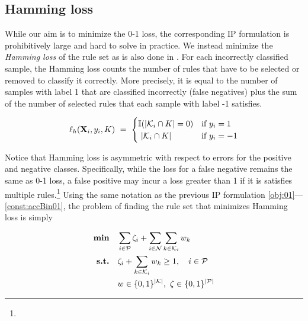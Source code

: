 \documentclass[twoside,11pt]{article}
\begin{document}
 \subsection{Hamming loss} \label{sec:ham}

While our aim is to minimize the 0-1 loss, the corresponding IP formulation is prohibitively large and hard to solve in practice. We instead minimize the {\em Hamming loss} of the rule set as is also done in \cite{su2016,lakkaraju2016}.  For each incorrectly classified sample, the Hamming loss counts %
    the number of rules that have to be selected or removed to classify it correctly.
	More precisely, it %
    is equal to the number of samples with label 1 that are classified incorrectly (false negatives) plus  the sum of the number of selected rules that each sample with label -1 satisfies.
    
\begin{definition}
$$\ell_{h}(\textbf{X}_i, y_i, K) ~=~
\begin{cases}
\mathbb{I}(\lvert{\cal K}_i \cap K \rvert= 0) & \text{if } y_i = 1\\
~\lvert\mathcal{K}_i \cap K\rvert &\text{if } y_i = -1
\end{cases}$$

\end{definition}
Notice that Hamming loss is asymmetric with respect to errors for the positive and negative classes. Specifically, while the loss for a false negative remains the same as 0-1 loss, a false positive may incur a loss greater than 1 if it is satisfies multiple rules.\footnote{}
Using the same notation as the previous IP formulation \eqref{obj:01}---\eqref{const:accBin01}, the problem of finding the rule set that minimizes Hamming loss is simply

\begin{align}
\textbf{min} \quad & \sum_{i\in \cal{P}} \zeta_i +\sum_{i\in \cal{N}} \sum_{k \in {\cal K}_i} w_k ~~ \label{obj:ham}\\
	\textbf{s.t.}  \quad
	& \zeta_i + \sum_{k\in {\cal K}_i} w_k \geq 1 , \quad i \in \cal{P}~~ \label{const:hamP} \\
	&	w\in \{0,1\}^{\lvert\mathcal{K}\rvert},~ \zeta\in \{0,1\}^{\lvert\mathcal{P}\rvert}  \label{const:hamBin}
\end{align}
\end{document}
